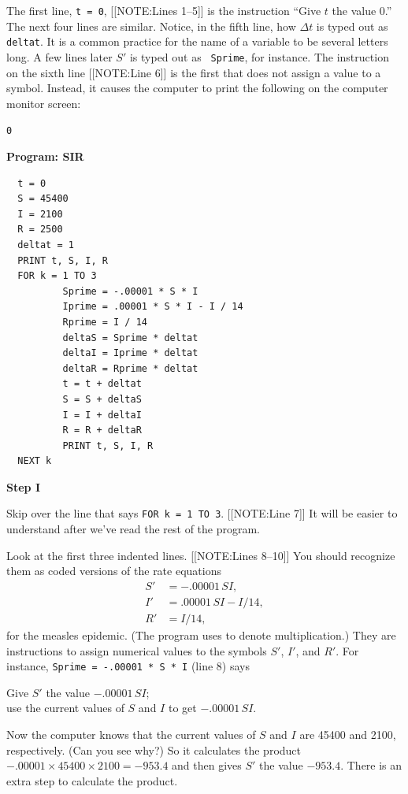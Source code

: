 The first line, {\tt t = 0}, 
[[NOTE:Lines 1--5]]
is the instruction ``Give $t$ the value 0.''  The next four lines are
similar.  Notice, in the fifth line, how $\Delta t$ is typed out as
{\tt deltat}.  It is a common practice for the name of a variable to
be several letters long.  A few lines later $S'$ is typed out as {\tt
  Sprime}, for instance.  The instruction on the sixth line [[NOTE:Line
  6]] is the first that does not assign a value to a symbol.  Instead,
it causes the computer to print the following on the computer monitor
screen:
\begin{center}
{\tt 0}   
\end{center}



\begin{center}

{\bf Program: SIR}\label{prog}
\end{center}




\begin{verbatim}
  t = 0
  S = 45400
  I = 2100
  R = 2500
  deltat = 1
  PRINT t, S, I, R
  FOR k = 1 TO 3
          Sprime = -.00001 * S * I
          Iprime = .00001 * S * I - I / 14
          Rprime = I / 14
          deltaS = Sprime * deltat
          deltaI = Iprime * deltat
          deltaR = Rprime * deltat
          t = t + deltat
          S = S + deltaS
          I = I + deltaI
          R = R + deltaR
          PRINT t, S, I, R
  NEXT k
\end{verbatim}

\textbf{Step I}





Skip over the line that says {\tt FOR k = 1 TO 3}.  
[[NOTE:Line 7]]
It will be easier to understand after we've read the rest of the
program.

Look at the first three indented lines.  
[[NOTE:Lines 8--10]]
You should recognize them as coded versions of the rate equations
\begin{align*}
S' &= -.00001\,SI, \\
I' &= .00001\,SI - I/14, \\
R' &= I/14,
\end{align*}
for the measles epidemic.  (The program uses {\tt *} to denote
multiplication.)  They are instructions to assign numerical values to
the symbols $S'$, $I'$, and $R'$.  For instance, {\tt Sprime = -.00001
  * S * I} (line 8) says
\begin{center}
Give $S'$ the value $-.00001\,SI$; \\
use the current values of $S$ and $I$ to get $-.00001\,SI$. \\
		\end{center}
Now the computer knows that the current values of $S$ and $I$ are
45400 and 2100, respectively.  (Can you see why?)  So it calculates
the product $-.00001 \times 45400 \times 2100 = -953.4$ and then gives
$S'$ the value $-953.4$.  There is an extra step to calculate the
product.


